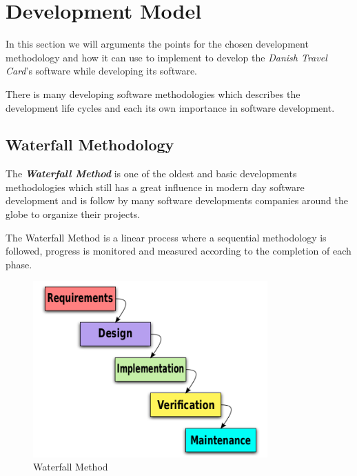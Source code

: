 \renewcommand{\headrulewidth}{0.1pt}
\renewcommand{\footrulewidth}{0.1pt}

\section*{Development Model}

In this section we will arguments the points for the chosen development methodology and how it can use to implement to develop the  \textit{Danish Travel Card}'s software while developing its software.

There is many developing software methodologies which describes the development life cycles and each its own importance in software development.
 
\subsection*{Waterfall Methodology}

The \textbf{\emph{Waterfall Method}} is one of the oldest and basic developments methodologies which still has a great influence in modern day software development and is follow by many software developments companies around the globe to organize their projects.

The Waterfall Method is a linear process where a sequential methodology is followed, progress is monitored and measured according to the completion of each phase.

\begin{figure}[ht!]
\centering
\includegraphics[width=90mm]{graphics/Waterfall_model.png}
\caption{Waterfall Method}
\label{overflow}
\end{figure}

